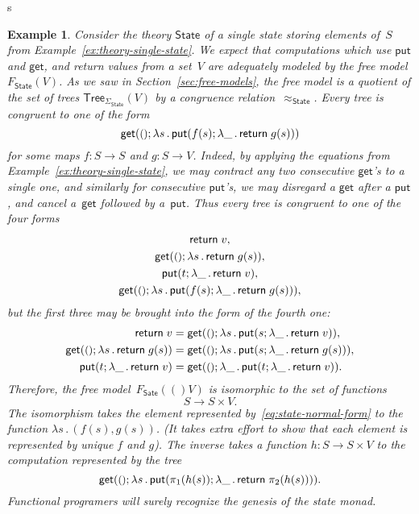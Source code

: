 s\documentclass{amsart}
\newcommand{\theory}[1]{\mathsf{#1}} %
\newcommand{\signature}[1]{\Sigma_{\theory{#1}}} %
\newcommand{\Free}[2]{F_{\theory{#1}}(#2)} %
\newcommand{\lam}[1]{\lambda #1 \,.\,}
\newcommand{\Tree}[2]{\mathsf{Tree}_{#1}(#2)} %
\newcommand{\unit}{{\text{\small$()$}}} %
\newcommand{\kode}[1]{\mathsf{#1}}
\newcommand{\opcall}[3]{\kode{#1}(#2; #3)}
\newcommand{\return}[1]{\kode{return}\;#1}
\newtheorem{example}[definition]{Example}
\begin{document}
\begin{example}
  Consider the theory $\theory{State}$ of a single state storing elements of~$S$
  from Example~\ref{ex:theory-single-state}. We expect that computations which
  use $\kode{put}$ and $\kode{get}$, and return values from a set~$V$ are
  adequately modeled by the free model $\Free{State}{V}$. As we saw in
  Section~\ref{sec:free-models}, the free model is a quotient of the set of
  trees $\Tree{\signature{State}}{V}$ by a congruence
  relation~$\approx_{\theory{State}}$. Every tree is congruent to one of the
  form
  \begin{equation}
    \label{eq:state-normal-form}
    \opcall{get}{\unit}{
      \lam{s} \opcall{put}{f(s)}{\lam{\_} \return{g(s)}}
    }
  \end{equation}
  for some maps $f : S \to S$ and $g : S \to V$. Indeed, by applying the
  equations from Example~\ref{ex:theory-single-state}, we may contract any two
  consecutive $\kode{get}$'s to a single one, and similarly for consecutive
  $\kode{put}$'s, we may disregard a $\kode{get}$ after a $\kode{put}$, and
  cancel a~$\kode{get}$ followed by a~$\kode{put}$. Thus every tree is congruent
  to one of the four forms
  \begin{gather*}
    \return{v},\\
    \opcall{get}{\unit}{\lam{s} \return{g(s)}},\\
    \opcall{put}{t}{\lam{\_} \return{v}},\\
    \opcall{get}{\unit}{
      \lam{s} \opcall{put}{f(s)}{\lam{\_} \return{g(s)}}
    },
  \end{gather*}
  but the first three may be brought into the form of the fourth one:
  \begin{align*}
    \return{v} &= 
    \opcall{get}{\unit}{\lam{s} \opcall{put}{s}{\lam{\_} \return{v}}},
    \\
    \opcall{get}{\unit}{\lam{s} \return{g(s)}} &=
    \opcall{get}{\unit}{\lam{s} \opcall{put}{s}{\lam{\_} \return{g(s)}}},
    \\
    \opcall{put}{t}{\lam{\_} \return{v}} &=
    \opcall{get}{\unit}{\lam{\_} \opcall{put}{t}{\lam{\_} \return{v}}}.
  \end{align*}
  Therefore, the free model~$\Free{Sate}(V)$ is isomorphic to the set of
  functions
  \begin{equation*}
    S \to S \times V.
  \end{equation*}
  The isomorphism takes the element represented by~\eqref{eq:state-normal-form}
  to the function $\lam{s} (f(s), g(s))$. (It takes extra effort to show that
  each element is represented by unique $f$ and $g$). The inverse takes a
  function $h : S \to S \times V$ to the computation represented by the tree
  \begin{equation*}
    \opcall{get}{\unit}{
      \lam{s} \opcall{put}{\pi_1(h(s))}{\lam{\_} \return{\pi_2(h(s))}}
    }.
  \end{equation*}
  Functional programers will surely recognize the genesis of the state monad.
\end{example}
\end{document}
